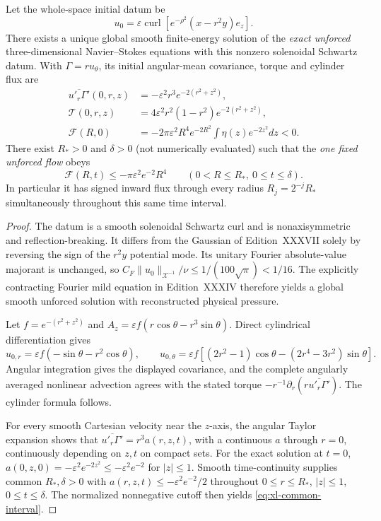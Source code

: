 \begin{theorem}
\label{thm:xl-single-flow}
Let the whole-space initial datum be
\begin{equation}\label{eq:xl-datum}
u_0=\varepsilon\operatorname{curl}
[e^{-\rho^2}(x-r^2y)e_z].
\end{equation}
There exists a unique global smooth finite-energy solution of
the \emph{exact unforced} three-dimensional Navier--Stokes equations
with this nonzero solenoidal Schwartz datum. With
$\Gamma=ru_\theta$, its initial angular-mean covariance,
torque and cylinder flux are
\begin{align}
\overline{u'_r\Gamma'}(0,r,z)
&=-\varepsilon^2r^3e^{-2(r^2+z^2)},\\
\mathcal T(0,r,z)
&=4\varepsilon^2r^2(1-r^2)e^{-2(r^2+z^2)},\\
\mathcal F(R,0)
&=-2\pi\varepsilon^2R^4e^{-2R^2}
\int\eta(z)e^{-2z^2}dz<0.
\end{align}
There exist $R_*>0$ and $\delta>0$ (not numerically
evaluated) such that the \emph{one fixed unforced flow} obeys
\begin{equation}\label{eq:xl-common-interval}
\boxed{\quad
\mathcal F(R,t)\le-\pi\varepsilon^2e^{-2}R^4
\qquad(0<R\le R_*,\ 0\le t\le\delta).\quad}
\end{equation}
In particular it has signed inward flux through every radius
$R_j=2^{-j}R_*$ simultaneously throughout this same time interval.
\end{theorem}
\begin{proof}
The datum is a smooth solenoidal Schwartz curl and is
nonaxisymmetric and reflection-breaking.
It differs from the Gaussian of Edition~XXXVII solely by
reversing the sign of the $r^2y$ potential mode.
Its unitary Fourier absolute-value majorant is unchanged,
so $C_F\|u_0\|_{\mathcal X^{-1}}/\nu
\le1/(100\sqrt\pi)<1/16$.
The explicitly contracting Fourier mild equation in
Edition~XXXIV therefore yields a global smooth unforced
solution with reconstructed physical pressure.

Let $f=e^{-(r^2+z^2)}$ and
$A_z=\varepsilon f(r\cos\theta-r^3\sin\theta)$.
Direct cylindrical differentiation gives
\[
u_{0,r}=\varepsilon f(-\sin\theta-r^2\cos\theta),\qquad
u_{0,\theta}=\varepsilon f[
(2r^2-1)\cos\theta-(2r^4-3r^2)\sin\theta].
\]
Angular integration gives the displayed covariance,
and the complete angularly averaged nonlinear advection
agrees with the stated torque
$-r^{-1}\partial_r(r\overline{u'_r\Gamma'})$.
The cylinder formula follows.

For every smooth Cartesian velocity near the $z$-axis,
the angular Taylor expansion shows that
$\overline{u'_r\Gamma'}=r^3a(r,z,t)$, with a continuous
$a$ through $r=0$, continuously depending on $z,t$
on compact sets. For the exact solution at $t=0$,
$a(0,z,0)=-\varepsilon^2e^{-2z^2}\le
-\varepsilon^2e^{-2}$ for $|z|\le1$.
Smooth time-continuity supplies common
$R_*,\delta>0$ with
$a(r,z,t)\le-\varepsilon^2e^{-2}/2$ throughout
$0\le r\le R_*$, $|z|\le1$, $0\le t\le\delta$.
The normalized nonnegative cutoff then yields
\eqref{eq:xl-common-interval}.
\end{proof}

